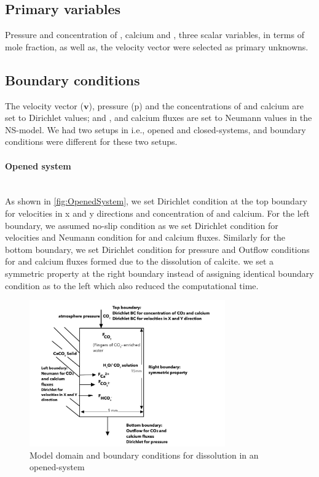 \subsection*{Primary variables} Pressure and concentration  of , calcium and , three scalar variables, in 
terms of mole fraction, as well as, the velocity vector were selected as primary unknowns. 

\subsection*{Boundary conditions} 
The velocity vector ($\mathbf{v}$), pressure (p) and the concentrations of  and calcium are set to Dirichlet values; 
and ,  and calcium fluxes are set to Neumann values in the NS-model. We had two setups in \DuMuX i.e., opened 
and closed-systems, and boundary conditions were different for these two setups.

\paragraph*{Opened system} \mbox{} \\

As shown in \cref{fig:OpenedSystem}, we set Dirichlet condition at the top boundary for velocities in x and y directions and 
concentration of  and calcium. For the left boundary, we assumed no-slip condition as we set Dirichlet condition for 
velocities and Neumann condition for  and calcium fluxes. Similarly for the bottom boundary, we set Dirichlet condition 
for pressure and Outflow conditions for  and calcium fluxes formed due to the dissolution of calcite. we set a symmetric 
property at the right boundary instead of assigning identical boundary condition as to the left which also reduced the computational time.

\begin{figure}
    \centering
    \includegraphics[width=0.75\textwidth]{PICTURES/open_system.jpg}
    \caption{Model domain and boundary conditions for  dissolution in an opened-system}
    \label{fig:OpenSystem}       %
\end{figure}


